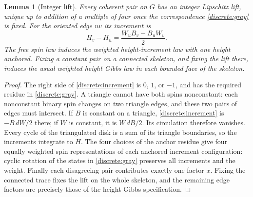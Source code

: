 \documentclass[11pt]{article}
\newtheorem{lemma}[theorem]{Lemma}
\theoremstyle{definition}
\theoremstyle{remark}
\numberwithin{equation}{section}
\begin{document}
\begin{lemma}[Integer lift]\label{lem:spin-lift}
Every coherent pair on $G$ has an integer Lipschitz lift, unique up to addition
of a multiple of four once the correspondence \eqref{discrete:gray} is fixed.
For the oriented edge $uv$ its increment is
\begin{equation}\label{discrete:increment}
 H_v-H_u=\frac{W_uB_v-B_uW_v}{2}.
\end{equation}
The free spin law induces the weighted height-increment law with one height
anchored. Fixing a constant pair on a connected skeleton, and fixing the lift
there, induces the usual weighted height Gibbs law in each bounded face of
the skeleton.
\end{lemma}
\begin{proof}
The right side of \eqref{discrete:increment} is $0$, $1$, or $-1$, and has
the required residue in \eqref{discrete:gray}. A triangle cannot have both
spins nonconstant: each nonconstant binary spin changes on two triangle
edges, and these two pairs of edges must intersect. If $B$ is constant on a
triangle, \eqref{discrete:increment} is $-B\,dW/2$ there; if $W$ is constant,
it is $W\,dB/2$. Its circulation therefore vanishes. Every cycle of the
triangulated disk is a sum of its triangle boundaries, so the increments
integrate to $H$. The four choices of the anchor residue give four equally
weighted spin representations of each anchored increment configuration:
cyclic rotation of the states in \eqref{discrete:gray} preserves all
increments and the weight. Finally each disagreeing pair contributes exactly
one factor $x$. Fixing the connected trace fixes the lift on the whole
skeleton, and the remaining edge factors are precisely those of the height
Gibbs specification.
\end{proof}
\end{document}
